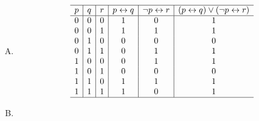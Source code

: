 {{\begin{practices}
\begin{enumerate}[A.]
{\begin{table}[H]
\[\begin{array}{c|c|c|c|c|c}
                                0 & 1 & 0 & 1 & 0 & 0 \\
                                0 & 1 & 1 & 1 & 1 & 1 \\
                                1 & 0 & 0 & 0 & 1 & 0 \\
                                1 & 0 & 1 & 0 & 1 & 0 \\
                                1 & 1 & 0 & 1 & 1 & 1 \\
                                1 & 1 & 1 & 1 & 1 & 1 \\
                                \hline
                            \end{array}
                        \]
                    \end{table}
                }
                \item
                {
                    \begin{table}[H]
                        \[
                            \begin{array}{c|c|c|c|c|c}
                                \hline
                                p & q & r & p \leftrightarrow q & \neg p \leftrightarrow r & (p \leftrightarrow q) \vee (\neg p \leftrightarrow r) \\
                                \hline
                                0 & 0 & 0 & 1 & 0 & 1 \\
                                0 & 0 & 1 & 1 & 1 & 1 \\
                                0 & 1 & 0 & 0 & 0 & 0 \\
                                0 & 1 & 1 & 0 & 1 & 1 \\
                                1 & 0 & 0 & 0 & 1 & 1 \\
                                1 & 0 & 1 & 0 & 0 & 0 \\
                                1 & 1 & 0 & 1 & 1 & 1 \\
                                1 & 1 & 1 & 1 & 0 & 1 \\
                                \hline
                            \end{array}
                        \]
                    \end{table}
                }
                \item
                {
                    \begin{table}[H]
                        \[
                            \begin{array}{c|c|c|c|c|c}

\end{array}\]
\end{table}}
\end{enumerate}
\end{practices}}}
